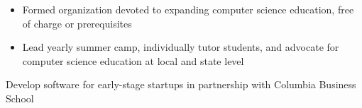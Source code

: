 \documentclass[10pt, letterpaper]{awesome-cv}
\begin{document}
\vspace*{-1ex}    
\vspace*{-2ex}    
\begin{skills}
    {\vspace*{-2.5ex}
    \begin{itemize}[noitemsep, label=\bullet]
        \item Formed organization devoted to expanding computer science education, free of charge or prerequisites
        \item Lead yearly summer camp, individually tutor students, and advocate for computer science education at local and state level
    \end{itemize}
    \vspace*{-3.5ex}}
    
	{Develop software for early-stage startups in partnership with Columbia Business School}
\end{skills}
\end{document}
